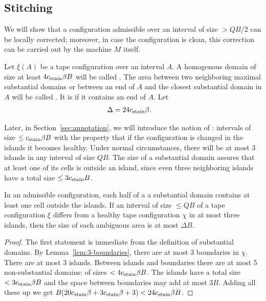 \documentclass[11pt]{memoir}
\theoremstyle{definition} %
\renewcommand{\le}{\leq}
\def\B{B}
\newcommand{\Q}{Q} %
\newcommand{\cns}[1]{c_{\textrm{\upshape #1}}}
\begin{document}
\subsection{Stitching}\label{sec:stitching}

We will show that a configuration admissible over an interval of size \( >\Q\B/2 \)
can be locally corrected;
moreover, in case the configuration is clean, this correction
can be carried out by the machine \( M \) itself.

\begin{definition}\label{def:substantial}
Let \( \xi(A) \) be a tape configuration over an interval \( A \).
A homogenous domain of size at least \( 4\cns{stain}\beta\B \) will be called .
The area between two neighboring maximal
substantial domains or between an end of \( A \) and the closest substantial domain in \( A \)
will be called .
It is  if it contains an end of \( A \).
Let
 \begin{align}\label{eq:Delta}
     \Delta &= 24\cns{stain}\beta. 
 \end{align}
\end{definition}

Later, in Section~\ref{sec:annotation}, we will introduce the notion of : intervals
of size \( \le\cns{stain}\beta\B \) with the property that if the configuration is changed in the
islands it becomes healthy.
Under normal circumstances, there will be at most 3 islands in any interval of size \( \Q\B \).
 The size of a substantial domain assures that at least one of its cells is
outside an island, since even three neighboring islands have a
total size \( \le 3\cns{stain}\B \).

\begin{lemma}\label{lem:ambiguous}
In an admissible configuration, each half of a 
a substantial domain contains at least one cell outside the islands.
If an interval of size \( \le  \Q\B \) of a tape configuration \( \xi \) differs from a  healthy tape 
configuration \( \chi \) in at most three islands, then 
the size of each ambiguous area is at most \( \Delta\B \).
\end{lemma}
\begin{proof}
The first statement is immediate from the definition of substantial domains.
By Lemma~\ref{lem:3-boundaries}, there are at most 3 boundaries in \( \chi \).
There are at most 3 islands.
Between islands and boundaries there are at most 5 non-substantial domains: of sizes
\( < 4\cns{stain}\beta\B \).
The islands have a total size \( <3\cns{stain}\beta\B \) and the space between boundaries may add at
most \( 3\B \).
Adding all these up we get \( \B(20\cns{stain}\beta + 3\cns{stain}\beta + 3) < 24\cns{stain}\beta\B \).
\end{proof}
\end{document}
